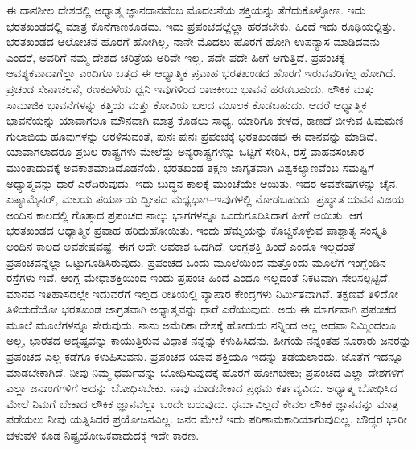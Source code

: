 ಈ ದಾನಶೀಲ ದೇಶದಲ್ಲಿ ಅಧ್ಯಾತ್ಮ ಜ್ಞಾನದಾನವೆಂಬ ಮೊದಲನೆಯ ಶಕ್ತಿಯನ್ನು ತೆಗೆದು\-ಕೊಳ್ಳೋಣ. ಇದು ಭರತಖಂಡದಲ್ಲಿ ಮಾತ್ರ ಕೊನೆಗಾಣಕೂಡದು. ಇದು ಪ್ರಪಂಚದಲ್ಲೆಲ್ಲಾ ಹರಡಬೇಕು. ಹಿಂದೆ ಇದು ರೂಢಿಯಲ್ಲಿತ್ತು. ಭರತಖಂಡದ ಆಲೋಚನೆ ಹೊರಗೆ ಹೋಗಿಲ್ಲ, ನಾನೇ ಮೊದಲು ಹೊರಗೆ ಹೋಗಿ ಉಪನ್ಯಾಸ ಮಾಡಿದವನು ಎಂದರೆ, ಅವರಿಗೆ ನಮ್ಮ ದೇಶದ ಚರಿತ್ರೆಯ ಅರಿವೇ ಇಲ್ಲ. ಪದೇ ಪದೇ ಹೀಗೆ ಆಗುತ್ತಿದೆ. ಪ್ರಪಂಚಕ್ಕೆ ಆವಶ್ಯಕವಾದಾಗೆಲ್ಲಾ ಎಂದಿಗೂ ಬತ್ತದ ಈ ಆಧ್ಯಾತ್ಮಿಕ ಪ್ರವಾಹ ಭರತಖಂಡದ ಹೊರಗೆ ಇರುವವರಿಗೆಲ್ಲ ಹೋಗಿದೆ. ಪ್ರಚಂಡ ಸೇನಾಚಲನೆ, ರಣಕಹಳೆಯ ಧ್ವನಿ ಇವುಗಳಿಂದ ರಾಜಕೀಯ ಭಾವನೆ ಹರಡಬಹುದು. ಲೌಕಿಕ ಮತ್ತು ಸಾಮಾಜಿಕ ಭಾವನೆಗಳನ್ನು ಕತ್ತಿಯ ಮತ್ತು ಕೋವಿಯ ಬಲದ ಮೂಲಕ ಕೊಡಬಹುದು. ಆದರೆ ಆಧ್ಯಾತ್ಮಿಕ ಭಾವನೆಯನ್ನು ಯಾವಾಗಲೂ ಮೌನವಾಗಿ ಮಾತ್ರ ಕೊಡಲು ಸಾಧ್ಯ. ಯಾರಿಗೂ ಕೇಳದೆ, ಕಾಣದೆ ಬೀಳುವ ಹಿಮಮಣಿ ಗುಲಾಬಿಯ ಹೂವುಗಳನ್ನು ಅರಳಿಸುವಂತೆ, ಪುನಃ ಪುನಃ ಪ್ರಪಂಚಕ್ಕೆ ಭರತಖಂಡವು ಈ ದಾನವನ್ನು ಮಾಡಿದೆ. ಯಾವಾಗಲಾದರೂ ಪ್ರಬಲ ರಾಷ್ಟ್ರಗಳು ಮೇಲೆದ್ದು ಅನ್ಯರಾಷ್ಟ್ರಗಳನ್ನು ಒಟ್ಟಿಗೆ ಸೇರಿಸಿ, ರಸ್ತೆ ವಾಹನಸಂಚಾರ ಮುಂತಾದುವಕ್ಕೆ ಅವಕಾಶಮಾಡಿದೊಡನೆಯೆ, ಭರತಖಂಡ ತಕ್ಷಣ ಜಾಗೃತವಾಗಿ ವಿಶ್ವಕಲ್ಯಾಣವೆಂಬ ಸಮಷ್ಟಿಗೆ ಅಧ್ಯಾತ್ಮವನ್ನು ಧಾರೆ ಎರೆದಿರುವುದು. ಇದು ಬುದ್ಧನ ಕಾಲಕ್ಕೆ ಮುಂಚೆಯೇ ಆಯಿತು. ಇದರ ಅವಶೇಷಗಳನ್ನು ಚೈನ, ಏಷ್ಯಾಮೈನರ್​, ಮಲಯ ಪರ್ಯಾಯ ದ್ವೀಪದ ಮಧ್ಯಭಾಗ–ಇವುಗಳಲ್ಲಿ ನೋಡಬಹುದು. ಪ್ರಖ್ಯಾತ ಯವನ ವಿಜಯ ಅಂದಿನ ಕಾಲದಲ್ಲಿ ಗೊತ್ತಾದ ಪ್ರಪಂಚದ ನಾಲ್ಕು ಭಾಗಗಳನ್ನೂ ಒಂದುಗೂಡಿಸಿದಾಗ ಹೀಗೆ ಆಯಿತು. ಆಗ ಭರತಖಂಡದ ಆಧ್ಯಾತ್ಮಿಕ ಪ್ರವಾಹ ಹರಿದುಹೋಯಿತು. ಇಂದು ಹೆಮ್ಮೆಯನ್ನು ಕೊಚ್ಚಿಕೊಳ್ಳುವ ಪಾಶ್ಚಾತ್ಯ ಸಂಸ್ಕೃತಿ ಅಂದಿನ ಕಾಲದ ಅವಶೇಷವಷ್ಟೆ. ಈಗ ಅದೇ ಅವಕಾಶ ಒದಗಿದೆ. ಆಂಗ್ಲಶಕ್ತಿ ಹಿಂದೆ ಎಂದೂ ಇಲ್ಲದಂತೆ ಪ್ರಪಂಚವನ್ನೆಲ್ಲಾ ಒಟ್ಟುಗೂಡಿಸಿರುವುದು. ಪ್ರಪಂಚದ ಒಂದು ಮೂಲೆಯಿಂದ ಮತ್ತೊಂದು ಮೂಲೆಗೆ ಇಂಗ್ಲೆಂಡಿನ ರಸ್ತೆಗಳು ಇವೆ. ಆಂಗ್ಲ ಮೇಧಾಶಕ್ತಿಯಿಂದ ಇಂದು ಪ್ರಪಂಚ ಹಿಂದೆ ಎಂದೂ ಇಲ್ಲದಂತೆ ನಿಕಟವಾಗಿ ಸೇರಿಸಲ್ಪಟ್ಟಿದೆ. ಮಾನವ ಇತಿಹಾಸದಲ್ಲೇ ಇದುವರೆಗೆ ಇಲ್ಲದ ರೀತಿಯಲ್ಲಿ ವ್ಯಾಪಾರ ಕೇಂದ್ರಗಳು ನಿರ್ಮಿತವಾಗಿವೆ. ತಕ್ಷಣವೆ ತಿಳಿದೋ ತಿಳಿಯದೆಯೋ ಭರತಖಂಡ ಜಾಗ್ರತವಾಗಿ ಅಧ್ಯಾತ್ಮವನ್ನು ಧಾರೆ ಎರೆಯುವುದು. ಅದು ಈ ಮಾರ್ಗವಾಗಿ ಪ್ರಪಂಚದ ಮೂಲೆ ಮೂಲೆಗಳನ್ನೂ ಸೇರುವುದು. ನಾನು ಅಮೆರಿಕಾ ದೇಶಕ್ಕೆ ಹೋದುದು ನನ್ನಿಂದ ಅಲ್ಲ ಅಥವಾ ನಿಮ್ಮಿಂದಲೂ ಅಲ್ಲ, ಭಾರತದ ಅದೃಷ್ಟವನ್ನು ಕಾಯುತ್ತಿರುವ ವಿಧಾತ ನನ್ನನ್ನು ಕಳುಹಿಸಿದನು. ಹೀಗೆಯೆ ನನ್ನಂತಹ ನೂರಾರು ಜನರನ್ನು ಪ್ರಪಂಚದ ಎಲ್ಲ ಕಡೆಗೂ ಕಳುಹಿಸುವನು. ಪ್ರಪಂಚದ ಯಾವ ಶಕ್ತಿಯೂ ಇದನ್ನು ತಡೆಯಲಾರದು. ಜೊತೆಗೆ ಇದನ್ನೂ ಮಾಡಬೇಕಾಗಿದೆ. ನೀವು ನಿಮ್ಮ ಧರ್ಮವನ್ನು ಬೋಧಿಸುವುದಕ್ಕೆ ಹೊರಗೆ ಹೋಗಬೇಕು; ಪ್ರಪಂಚದ ಎಲ್ಲಾ ದೇಶಗಳಿಗೆ ಎಲ್ಲಾ ಜನಾಂಗಗಳಿಗೆ ಅದನ್ನು ಬೋಧಿಸಬೇಕು. ನಾವು ಮಾಡಬೇಕಾದ ಪ್ರಥಮ ಕರ್ತವ್ಯವಿದು. ಅಧ್ಯಾತ್ಮ ಬೋಧಿಸಿದ ಮೇಲೆ ನಿಮಗೆ ಬೇಕಾದ ಲೌಕಿಕ ಜ್ಞಾನವೆಲ್ಲಾ ಬಂದೇ ಬರುವುದು. ಧರ್ಮವಿಲ್ಲದೆ ಕೇವಲ ಲೌಕಿಕ ಜ್ಞಾನವನ್ನು ಮಾತ್ರ ಪಡೆಯಲು ನೀವು ಯತ್ನಿಸಿದರೆ ಪ್ರಯೋಜನವಿಲ್ಲ. ಜನರ ಮೇಲೆ ಇದು ಪರಿಣಾಮಕಾರಿಯಾಗುವುದಿಲ್ಲ. ಬೌದ್ಧರ ಭಾರೀ ಚಳುವಳಿ ಕೂಡ ನಿಷ್ಪ್ರಯೋಜಕವಾದುದಕ್ಕೆ ಇದೇ ಕಾರಣ.

